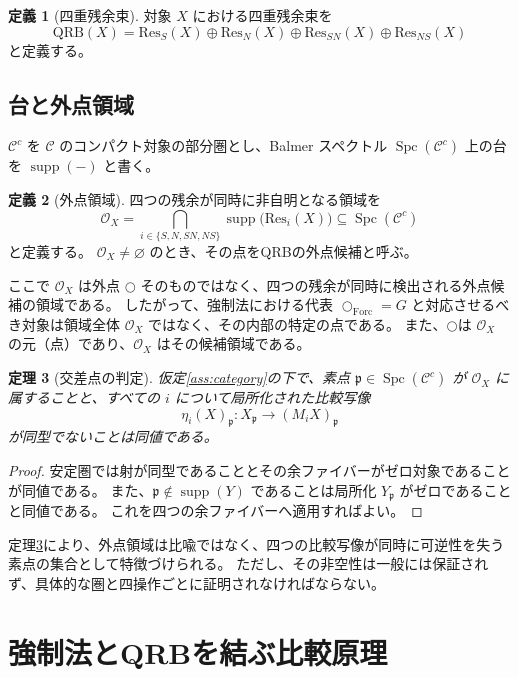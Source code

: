 \documentclass[11pt]{ltjsarticle}
\theoremstyle{plain}
\newtheorem{theorem}{定理}[section]
\theoremstyle{definition}
\newtheorem{definition}[theorem]{定義}
\newcommand{\QRB}{\mathrm{QRB}}
\newcommand{\Res}{\mathrm{Res}}
\newcommand{\Supp}{\operatorname{supp}}
\newcommand{\Spc}{\operatorname{Spc}}
\newcommand{\dfix}{\bigcirc}
\begin{document}
\begin{definition}[四重残余束]
対象 \(X\) における四重残余束を
\[
\QRB(X)=
\Res_S(X)\oplus\Res_N(X)\oplus
\Res_{SN}(X)\oplus\Res_{NS}(X)
\]
と定義する。
\end{definition}

\subsection{台と外点領域}

\(\mathcal{C}^c\) を \(\mathcal{C}\) のコンパクト対象の部分圏とし、Balmer スペクトル
\(\Spc(\mathcal{C}^c)\) 上の台を \(\Supp(-)\) と書く\cite{balmer2005}。

\begin{definition}[外点領域]
四つの残余が同時に非自明となる領域を
\[
\mathcal{O}_X=
\bigcap_{i\in\{S,N,SN,NS\}}\Supp\bigl(\Res_i(X)\bigr)
\subseteq\Spc(\mathcal{C}^c)
\]
と定義する。
\(\mathcal{O}_X\neq\varnothing\) のとき、その点をQRBの外点候補と呼ぶ。
\end{definition}

ここで \(\mathcal O_X\) は外点 \(\dfix\) そのものではなく、四つの残余が同時に検出される外点候補の領域である。
したがって、強制法における代表 \(\dfix_{\mathrm{Forc}}=G\) と対応させるべき対象は領域全体 \(\mathcal O_X\) ではなく、その内部の特定の点である。
また、\(\dfix\)は \(\mathcal O_X\) の元（点）であり、\(\mathcal O_X\) はその候補領域である。

\begin{theorem}[交差点の判定]\label{thm:intersection}
仮定\ref{ass:category}の下で、素点 \(\mathfrak{p}\in\Spc(\mathcal{C}^c)\) が \(\mathcal{O}_X\) に属することと、すべての \(i\) について局所化された比較写像
\[
\eta_i(X)_{\mathfrak p}\colon
X_{\mathfrak p}\longrightarrow(M_iX)_{\mathfrak p}
\]
が同型でないことは同値である。
\end{theorem}

\begin{proof}
安定圏では射が同型であることとその余ファイバーがゼロ対象であることが同値である。
また、\(\mathfrak p\notin\Supp(Y)\) であることは局所化 \(Y_{\mathfrak p}\) がゼロであることと同値である。
これを四つの余ファイバーへ適用すればよい。
\end{proof}

定理\ref{thm:intersection}により、外点領域は比喩ではなく、四つの比較写像が同時に可逆性を失う素点の集合として特徴づけられる。
ただし、その非空性は一般には保証されず、具体的な圏と四操作ごとに証明されなければならない。

\section{強制法とQRBを結ぶ比較原理}
\label{sec:comparison}
\end{document}
